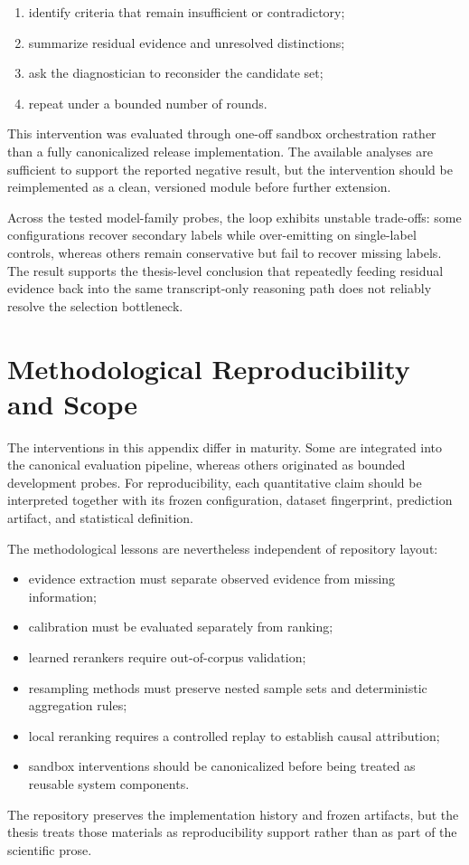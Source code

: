\begin{enumerate}
  \item identify criteria that remain insufficient or contradictory;
  \item summarize residual evidence and unresolved distinctions;
  \item ask the diagnostician to reconsider the candidate set;
  \item repeat under a bounded number of rounds.
\end{enumerate}

This intervention was evaluated through one-off sandbox orchestration rather
than a fully canonicalized release implementation. The available analyses are
sufficient to support the reported negative result, but the intervention
should be reimplemented as a clean, versioned module before further extension.

Across the tested model-family probes, the loop exhibits unstable trade-offs:
some configurations recover secondary labels while over-emitting on
single-label controls, whereas others remain conservative but fail to recover
missing labels. The result supports the thesis-level conclusion that repeatedly
feeding residual evidence back into the same transcript-only reasoning path
does not reliably resolve the selection bottleneck.

\section{Methodological Reproducibility and Scope}
\label{app:successor}

The interventions in this appendix differ in maturity. Some are integrated
into the canonical evaluation pipeline, whereas others originated as bounded
development probes. For reproducibility, each quantitative claim should be
interpreted together with its frozen configuration, dataset fingerprint,
prediction artifact, and statistical definition.

The methodological lessons are nevertheless independent of repository layout:

\begin{itemize}
  \item evidence extraction must separate observed evidence from missing
        information;
  \item calibration must be evaluated separately from ranking;
  \item learned rerankers require out-of-corpus validation;
  \item resampling methods must preserve nested sample sets and deterministic
        aggregation rules;
  \item local reranking requires a controlled replay to establish causal
        attribution;
  \item sandbox interventions should be canonicalized before being treated as
        reusable system components.
\end{itemize}

The repository preserves the implementation history and frozen artifacts, but
the thesis treats those materials as reproducibility support rather than as
part of the scientific prose.
